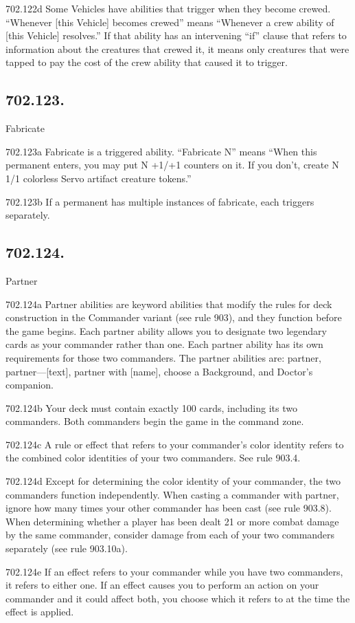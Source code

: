 702.122d Some Vehicles have abilities that trigger when they become crewed. “Whenever [this Vehicle] becomes crewed” means “Whenever a crew ability of [this Vehicle] resolves.” If that ability has an intervening “if” clause that refers to information about the creatures that crewed it, it means only creatures that were tapped to pay the cost of the crew ability that caused it to trigger.

\subsection*{702.123.}
Fabricate

702.123a Fabricate is a triggered ability. “Fabricate N” means “When this permanent enters, you may put N +1/+1 counters on it. If you don’t, create N 1/1 colorless Servo artifact creature tokens.”

702.123b If a permanent has multiple instances of fabricate, each triggers separately.

\subsection*{702.124.}
Partner

702.124a Partner abilities are keyword abilities that modify the rules for deck construction in the Commander variant (see rule 903), and they function before the game begins. Each partner ability allows you to designate two legendary cards as your commander rather than one. Each partner ability has its own requirements for those two commanders. The partner abilities are: partner, partner—[text], partner with [name], choose a Background, and Doctor’s companion.

702.124b Your deck must contain exactly 100 cards, including its two commanders. Both commanders begin the game in the command zone.

702.124c A rule or effect that refers to your commander’s color identity refers to the combined color identities of your two commanders. See rule 903.4.

702.124d Except for determining the color identity of your commander, the two commanders function independently. When casting a commander with partner, ignore how many times your other commander has been cast (see rule 903.8). When determining whether a player has been dealt 21 or more combat damage by the same commander, consider damage from each of your two commanders separately (see rule 903.10a).

702.124e If an effect refers to your commander while you have two commanders, it refers to either one. If an effect causes you to perform an action on your commander and it could affect both, you choose which it refers to at the time the effect is applied.

